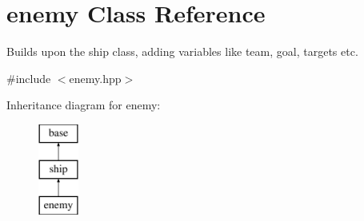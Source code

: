 \hypertarget{classenemy}{\section{enemy Class Reference}
\label{classenemy}
}


Builds upon the ship class, adding variables like team, goal, targets etc.  




{\ttfamily \#include $<$enemy.\-hpp$>$}

Inheritance diagram for enemy\-:\begin{figure}[H]
\begin{center}
\leavevmode
\includegraphics[height=3.000000cm]{classenemy}
\end{center}
\end{figure}

